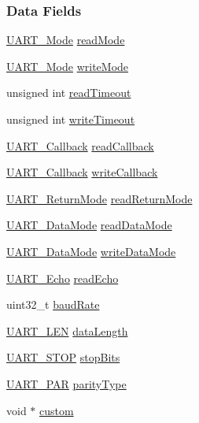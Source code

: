 \subsubsection*{Data Fields}
\begin{DoxyCompactItemize}
\item 
\hyperlink{_u_a_r_t_8h_a2507a620dba95cd20885c52494d19e90}{U\+A\+R\+T\+\_\+\+Mode} \hyperlink{struct_u_a_r_t___params_ab8677572499b3734fcaa00f6431b0e7b}{read\+Mode}
\item 
\hyperlink{_u_a_r_t_8h_a2507a620dba95cd20885c52494d19e90}{U\+A\+R\+T\+\_\+\+Mode} \hyperlink{struct_u_a_r_t___params_a53a95d4c2266d6e7ecea6640baf92d40}{write\+Mode}
\item 
unsigned int \hyperlink{struct_u_a_r_t___params_a10875d91873fb77106bde0b799f961e2}{read\+Timeout}
\item 
unsigned int \hyperlink{struct_u_a_r_t___params_a7a721cf5229c7c41074d262107cae501}{write\+Timeout}
\item 
\hyperlink{_u_a_r_t_8h_a44620a9d91e0357ebc6f0a79984d9e1e}{U\+A\+R\+T\+\_\+\+Callback} \hyperlink{struct_u_a_r_t___params_a5457b86b6793f1c4757457b9b22e379d}{read\+Callback}
\item 
\hyperlink{_u_a_r_t_8h_a44620a9d91e0357ebc6f0a79984d9e1e}{U\+A\+R\+T\+\_\+\+Callback} \hyperlink{struct_u_a_r_t___params_a0497d8a55aea66d3ab2118f8966e8e33}{write\+Callback}
\item 
\hyperlink{_u_a_r_t_8h_acb5a82843435a1b5d51b6c27028d914f}{U\+A\+R\+T\+\_\+\+Return\+Mode} \hyperlink{struct_u_a_r_t___params_a47382bd027b944868ce873ad71d29d0e}{read\+Return\+Mode}
\item 
\hyperlink{_u_a_r_t_8h_a694090fdb166f94ac30b809f9cba87b8}{U\+A\+R\+T\+\_\+\+Data\+Mode} \hyperlink{struct_u_a_r_t___params_a707659dcecb10f490000511ec2de2060}{read\+Data\+Mode}
\item 
\hyperlink{_u_a_r_t_8h_a694090fdb166f94ac30b809f9cba87b8}{U\+A\+R\+T\+\_\+\+Data\+Mode} \hyperlink{struct_u_a_r_t___params_a02e8b9127a7d6fa49021f01a7ee69ad2}{write\+Data\+Mode}
\item 
\hyperlink{_u_a_r_t_8h_aac6a03c2e1d76f53e1d9d923dcdc24f2}{U\+A\+R\+T\+\_\+\+Echo} \hyperlink{struct_u_a_r_t___params_a61642ef82bbcfc98494739a98afff58a}{read\+Echo}
\item 
uint32\+\_\+t \hyperlink{struct_u_a_r_t___params_afadb98d0a0ef6e17240bab79306e7828}{baud\+Rate}
\item 
\hyperlink{_u_a_r_t_8h_adf245d5f10db0abcbd8ad62a0d80c694}{U\+A\+R\+T\+\_\+\+L\+E\+N} \hyperlink{struct_u_a_r_t___params_adb937e0b27c71886e58953312d3d1376}{data\+Length}
\item 
\hyperlink{_u_a_r_t_8h_a176b71ca19bc13d7534fa30fc18c2243}{U\+A\+R\+T\+\_\+\+S\+T\+O\+P} \hyperlink{struct_u_a_r_t___params_a59f12dc5b7329f484573521c0e2b3d78}{stop\+Bits}
\item 
\hyperlink{_u_a_r_t_8h_ac70b5aa75500b8c45a51ec560deccfc4}{U\+A\+R\+T\+\_\+\+P\+A\+R} \hyperlink{struct_u_a_r_t___params_acaa90dc09cd820477c5bfaae152a2010}{parity\+Type}
\item 
void $\ast$ \hyperlink{struct_u_a_r_t___params_ab4df0d3f6c1e1121f303d11271abb7a1}{custom}
\end{DoxyCompactItemize}


